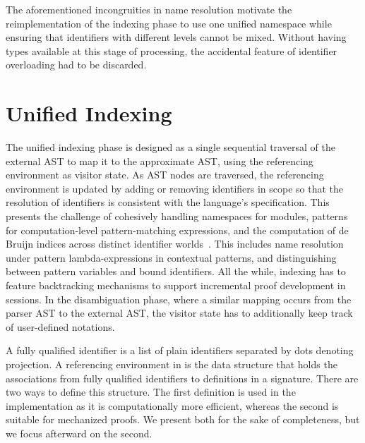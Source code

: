 The aforementioned incongruities in name resolution motivate the reimplementation of the indexing phase to use one unified namespace while ensuring that identifiers with different levels cannot be mixed.
Without having types available at this stage of processing, the accidental feature of identifier overloading had to be discarded.



\section{Unified Indexing}\label{section:indexing}


The unified indexing phase is designed as a single sequential traversal of the external \ac{AST} to map it to the approximate \ac{AST}, using the referencing environment as visitor state.
As \ac{AST} nodes are traversed, the referencing environment is updated by adding or removing identifiers in scope so that the resolution of identifiers is consistent with the language's specification.
This presents the challenge of cohesively handling namespaces for modules, patterns for computation-level pattern-matching expressions, and the computation of de Bruijn indices across distinct identifier worlds~\cite{ferreira2012compiler}.
This includes name resolution under pattern lambda-expressions in contextual \LF patterns, and distinguishing between pattern variables and bound identifiers.
All the while, indexing has to feature backtracking mechanisms to support incremental proof development in \Harpoon sessions.
In the disambiguation phase, where a similar mapping occurs from the parser \ac{AST} to the external \ac{AST}, the visitor state has to additionally keep track of user-defined notations.

A fully qualified identifier is a list of plain identifiers separated by dots denoting projection.
A referencing environment in \Beluga is the data structure that holds the associations from fully qualified identifiers to definitions in a signature.
There are two ways to define this structure.
The first definition is used in the implementation as it is computationally more efficient, whereas the second is suitable for mechanized proofs.
We present both for the sake of completeness, but we focus afterward on the second.

